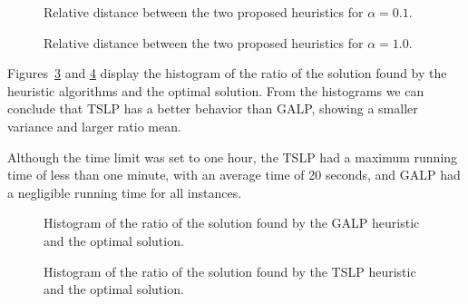 \begin{figure}
\centering
\caption{Relative distance between the two proposed heuristics for $\alpha=0.1$.}
\label{fig:comp_2}
\end{figure}

\begin{figure}
\centering
\caption{Relative distance between the two proposed heuristics for $\alpha=1.0$.}
\label{fig:comp_3}
\end{figure}

Figures~\ref{fig:lpgavsmip} and \ref{fig:lptsvsmip} display the histogram of
the ratio of the solution found by the heuristic algorithms and the optimal solution.
From the histograms we can conclude that TSLP has a better behavior than GALP,
showing a smaller variance and larger ratio mean.

Although the time limit was set to one hour, the TSLP had a maximum running time of less than one minute, with an average time of 20 seconds, and GALP had a negligible running time for all instances.

\begin{figure}
\centering
\caption{Histogram of the ratio of the solution found by the GALP heuristic and the optimal solution.}
\label{fig:lpgavsmip}
\end{figure}

\begin{figure}
\centering
\caption{Histogram of the ratio of the solution found by the TSLP heuristic and the optimal solution.}
\label{fig:lptsvsmip}
\end{figure}


